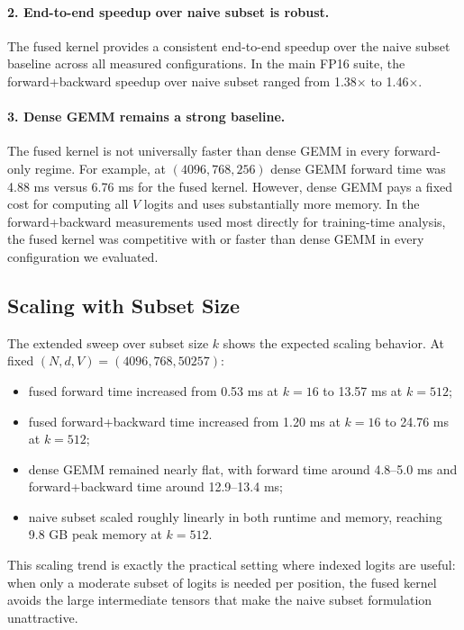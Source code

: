 \paragraph{2. End-to-end speedup over naive subset is robust.}
The fused kernel provides a consistent end-to-end speedup over the naive subset baseline across all measured configurations. In the main FP16 suite, the forward+backward speedup over naive subset ranged from 1.38$\times$ to 1.46$\times$.

\paragraph{3. Dense GEMM remains a strong baseline.}
The fused kernel is not universally faster than dense GEMM in every forward-only regime. For example, at $(4096,768,256)$ dense GEMM forward time was 4.88 ms versus 6.76 ms for the fused kernel. However, dense GEMM pays a fixed cost for computing all $V$ logits and uses substantially more memory. In the forward+backward measurements used most directly for training-time analysis, the fused kernel was competitive with or faster than dense GEMM in every configuration we evaluated.

\subsection{Scaling with Subset Size}

The extended sweep over subset size $k$ shows the expected scaling behavior. At fixed $(N,d,V)=(4096,768,50257)$:
\begin{itemize}
\item fused forward time increased from 0.53 ms at $k=16$ to 13.57 ms at $k=512$;
\item fused forward+backward time increased from 1.20 ms at $k=16$ to 24.76 ms at $k=512$;
\item dense GEMM remained nearly flat, with forward time around 4.8--5.0 ms and forward+backward time around 12.9--13.4 ms;
\item naive subset scaled roughly linearly in both runtime and memory, reaching 9.8 GB peak memory at $k=512$.
\end{itemize}

This scaling trend is exactly the practical setting where indexed logits are useful: when only a moderate subset of logits is needed per position, the fused kernel avoids the large intermediate tensors that make the naive subset formulation unattractive.


